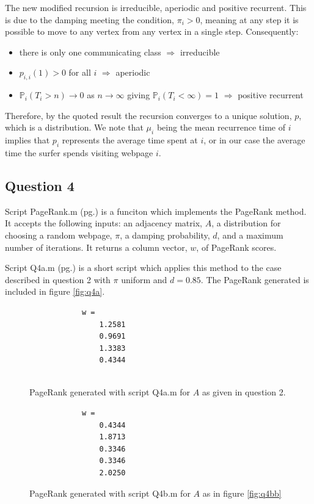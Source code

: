 \documentclass[a4paper]{article}
\begin{document}
\bigskip
The new modified recursion is irreducible, aperiodic and positive recurrent. This is due to the damping meeting the condition, $\pi_i > 0$, meaning at any step it is possible to move to any vertex from any vertex in a single step. Consequently:
\begin{itemize}
    \item
    there is only one communicating class $\Rightarrow$ irreducible
    \item
    $p_{i,i}(1) > 0$ for all $i$ $\Rightarrow$ aperiodic
    \item
    $\mathbb{P}_i(T_i>n) \rightarrow 0$ as $n \rightarrow \infty$ giving $\mathbb{P}_i(T_i<\infty) = 1$ $\Rightarrow$ positive recurrent
\end{itemize}

Therefore, by the quoted result the recursion converges to a unique solution, $p$, which is a distribution. We note that $\mu_i$ being the mean recurrence time of $i$ implies that $p_i$ represents the average time spent at $i$, or in our case the average time the surfer spends visiting webpage $i$.

\subsection*{Question 4}

Script PageRank.m (pg.\pageref{PPageRank}) is a funciton which implements the PageRank method. It accepts the following inputs:
an adjacency matrix, $A$, a distribution for choosing a random webpage, $\pi$, a damping probability, $d$, and a maximum number of iterations. It returns a column vector, $w$, of PageRank scores.

\bigskip
Script Q4a.m (pg.\pageref{fig:q4a}) is a short script which applies this method to the case described in question 2 with $\pi$ uniform and $d=0.85$. The PageRank generated is included in figure \ref{fig:q4a}.
\begin{figure}[H]
    \centering
    \begin{minipage}[b]{0.45\linewidth}
        \centering
        \begin{verbatim}
            w =
                1.2581
                0.9691
                1.3383
                0.4344
                
        \end{verbatim}
        \caption{PageRank generated with script Q4a.m for $A$ as given in question 2.}
        \label{fig:q4a}
    \end{minipage}
    \hfill
    \begin{minipage}[b]{0.45\linewidth}
        \centering
        \begin{verbatim}
            w =
                0.4344
                1.8713
                0.3346
                0.3346
                2.0250
        \end{verbatim}
        \caption{PageRank generated with script Q4b.m for $A$ as in figure \ref{fig:q4bb}}
        \label{fig:q4b}
    \end{minipage}
\end{figure}
\end{document}

